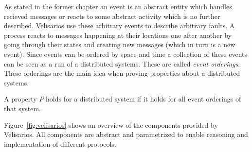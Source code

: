 As stated in the former chapter an event is an abstract entity which handles
recieved messages or reacts to some abstract activity which is no further
described. Velisarios use these arbitrary events to describe arbitrary faults.
A process reacts to messages happening at their locations one after another
by going through their states and creating new messages (which in turn
is a new event). Since events can be ordered by space and time a collection
of these events can be seen as a run of a distributed systems. These are
called \textit{event orderings}. These orderings are the main idea when proving
properties about a distributed systems.~\cite{rahli2018velisarios}

\begin{defi}
  A property $P$ holds for a distributed system if it holds
  for all event orderings of that system.
\end{defi}

Figure~\ref{fig:velisarios} shows an overview of the components provided
by Velisarios. All components are abstract and parametrized to enable
reasoning and implementation of different protocols.~\cite{rahli2018velisarios}







